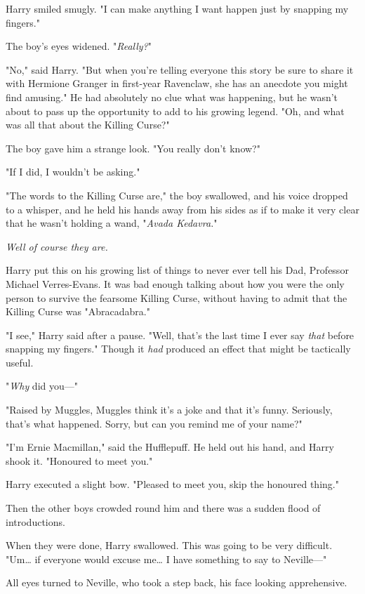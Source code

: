 Harry smiled smugly. "I can make anything I want happen just by snapping my 
fingers."

The boy's eyes widened. "\emph{Really?}"

"No," said Harry. "But when you're telling everyone this story be sure to share 
it with Hermione Granger in first-year Ravenclaw, she has an anecdote you might 
find amusing." He had absolutely no clue what was happening, but he wasn't 
about to pass up the opportunity to add to his growing legend. "Oh, and what 
was all that about the Killing Curse?"

The boy gave him a strange look. "You really don't know?"

"If I did, I wouldn't be asking."

"The words to the Killing Curse are," the boy swallowed, and his voice dropped 
to a whisper, and he held his hands away from his sides as if to make it very 
clear that he wasn't holding a wand, "\emph{Avada Kedavra.}"

\emph{Well of course they are.}

Harry put this on his growing list of things to never ever tell his Dad, 
Professor Michael Verres-Evans. It was bad enough talking about how you were 
the only person to survive the fearsome Killing Curse, without having to admit 
that the Killing Curse was "Abracadabra."

"I see," Harry said after a pause. "Well, that's the last time I ever say 
\emph{that} before snapping my fingers." Though it \emph{had} produced an 
effect that might be tactically useful.

"\emph{Why} did you---"

"Raised by Muggles, Muggles think it's a joke and that it's funny. Seriously, 
that's what happened. Sorry, but can you remind me of your name?"

"I'm Ernie Macmillan," said the Hufflepuff. He held out his hand, and Harry 
shook it. "Honoured to meet you."

Harry executed a slight bow. "Pleased to meet you, skip the honoured thing."

Then the other boys crowded round him and there was a sudden flood of 
introductions.

When they were done, Harry swallowed. This was going to be very difficult. 
"Um{\ldots} if everyone would excuse me{\ldots} I have something to say to 
Neville---"

All eyes turned to Neville, who took a step back, his face looking apprehensive.

